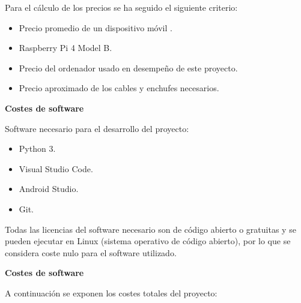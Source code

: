 Para el cálculo de los precios se ha seguido el siguiente criterio:

\begin{itemize}
\item
	Precio promedio de un dispositivo móvil \cite{art:pricesmartphone}.
\item
	Raspberry Pi 4 Model B.
\item
	Precio del ordenador usado en desempeño de este proyecto.
\item
	Precio aproximado de los cables y enchufes necesarios.
\end{itemize}

\textbf{Costes de software}

Software necesario para el desarrollo del proyecto:

\begin{itemize}
\item
	Python 3.
\item
	Visual Studio Code.
\item
	Android Studio.
\item
	Git.
\end{itemize}

Todas las licencias del software necesario son de código abierto o gratuitas y se pueden ejecutar en Linux (sistema operativo de código abierto), por lo que se considera coste nulo para el software utilizado.

\textbf{Costes de software}

A continuación se exponen los costes totales del proyecto:

